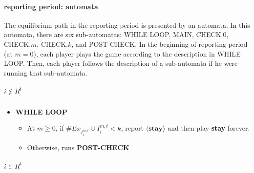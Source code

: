 \documentclass[12pt,letterpaper]{article}
\newtheorem*{main result}{Main Result}
\theoremstyle{definition}
\theoremstyle{remark}
\theoremstyle{claim}
\begin{document}
\paragraph{reporting period: automata}

The equilibrium path in the reporting period is presented by an automata. In this automata, there are six sub-automatas: WHILE LOOP, MAIN, CHECK.$0$, CHECK.$m$, CHECK.$k$, and POST-CHECK. In the beginning of reporting period (at $m=0$), each player plays the game according to the description in WHILE LOOP. Then, each player follows the description of a sub-automata if he were running that sub-automata.

\subparagraph{$i\notin R^{t}$}




\begin{itemize}
\item \textbf{WHILE LOOP}
\begin{itemize}
\item At $m\geq 0$, if $\#Ex_{I^{m,t}_i}\cup I^{m,t}_i< k$, report $\langle \textbf{stay} \rangle$ and then play \textbf{stay} forever.
\item Otherwise, runs \textbf{POST-CHECK }
\end{itemize}
\end{itemize}

\subparagraph{$i\in R^{t}$}
\end{document}
